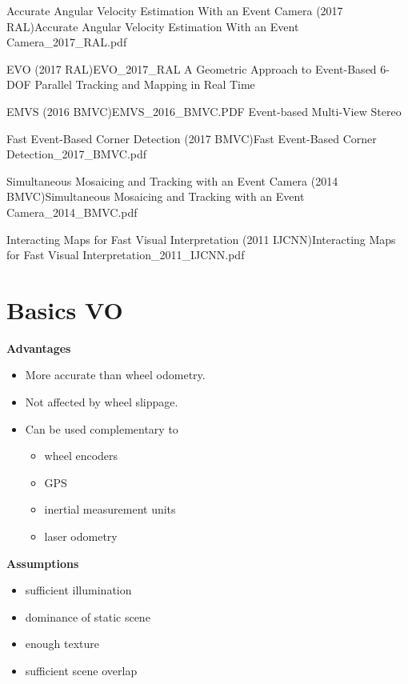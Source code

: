 \documentclass[10pt,a4paper]{scrartcl}
\begin{document}
\begin{multicols*}{2}
\begin{Paper}{Accurate Angular Velocity Estimation With an Event Camera (2017 RAL)}{Accurate Angular Velocity Estimation With an Event Camera_2017_RAL.pdf}
\end{Paper}

\begin{Paper}{EVO (2017 RAL)}{EVO_2017_RAL}
A Geometric Approach to Event-Based 6-DOF Parallel Tracking and Mapping in Real Time
\end{Paper}

\begin{Paper}{EMVS (2016 BMVC)}{EMVS_2016_BMVC.PDF}
Event-based Multi-View Stereo
\end{Paper}

\begin{Paper}{Fast Event-Based Corner Detection (2017 BMVC)}{Fast Event-Based Corner Detection_2017_BMVC.pdf}
\end{Paper}

\begin{Paper}{Simultaneous Mosaicing and Tracking with an Event Camera (2014 BMVC)}{Simultaneous Mosaicing and Tracking with an Event Camera_2014_BMVC.pdf}
\end{Paper}

\begin{Paper}{Interacting Maps for Fast Visual Interpretation (2011 IJCNN)}{Interacting Maps for Fast Visual Interpretation_2011_IJCNN.pdf}
\end{Paper}

\section{Basics VO}

\textbf{Advantages}
\begin{itemize}
\item More accurate than wheel odometry.
\item Not affected by wheel slippage.
\item Can be used complementary to
\begin{itemize}
\item wheel encoders
\item GPS
\item inertial measurement units
\item laser odometry
\end{itemize}
\end{itemize}

\textbf{Assumptions}
\begin{itemize}
\item sufficient illumination
\item dominance of static scene
\item enough texture
\item sufficient scene overlap
\end{itemize}


\end{multicols*}
\end{document}
